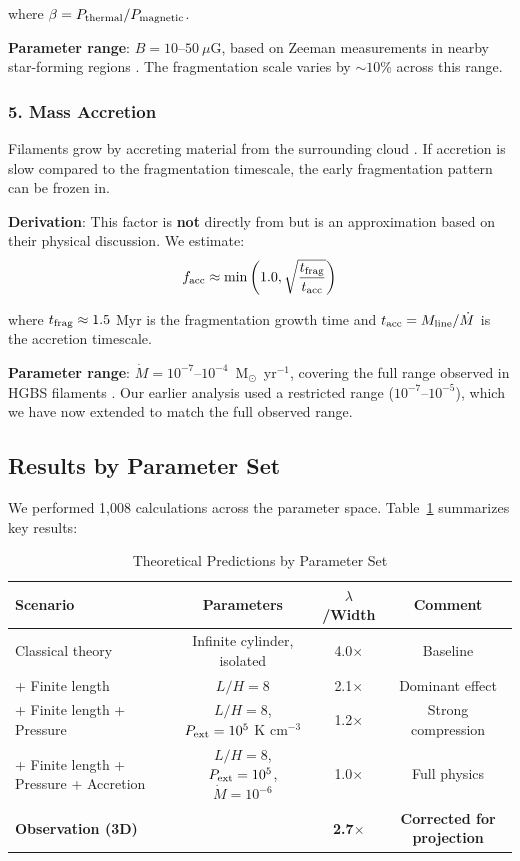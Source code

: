 \documentclass[11pt,a4paper]{article}
\begin{document}
where $\beta = P_{\rm thermal}/P_{\rm magnetic}$.

\textbf{Parameter range}: $B = 10$--$50~\mu$G, based on Zeeman measurements in nearby star-forming regions \citep{Crutcher2012}. The fragmentation scale varies by $\sim10\%$ across this range.

\subsubsection{5. Mass Accretion}

Filaments grow by accreting material from the surrounding cloud \citep{Heitsch2013}. If accretion is slow compared to the fragmentation timescale, the early fragmentation pattern can be frozen in.

\textbf{Derivation}: This factor is \textbf{not} directly from \citet{Heitsch2013} but is an approximation based on their physical discussion. We estimate:
\begin{equation}
f_{\rm acc} \approx \min\left(1.0, \sqrt{\frac{t_{\rm frag}}{t_{\rm acc}}}\right)
\end{equation}

where $t_{\rm frag} \approx 1.5$ Myr is the fragmentation growth time and $t_{\rm acc} = M_{\rm line}/\dot{M}$ is the accretion timescale.

\textbf{Parameter range}: $\dot{M} = 10^{-7}$--$10^{-4}$~M$_\odot$~yr$^{-1}$, covering the full range observed in HGBS filaments \citep{Palmeirim2013, Kirk2013}. Our earlier analysis used a restricted range ($10^{-7}$--$10^{-5}$), which we have now extended to match the full observed range.

\subsection{Results by Parameter Set}

We performed 1,008 calculations across the parameter space. Table~\ref{tab:results} summarizes key results:

\begin{table}[H]
\centering
\caption{Theoretical Predictions by Parameter Set}
\label{tab:results}
\begin{tabular}{lccc}
\toprule
Scenario & Parameters & $\lambda$/Width & Comment \\
\midrule
Classical theory & Infinite cylinder, isolated & 4.0$\times$ & Baseline \\
+ Finite length & $L/H=8$ & 2.1$\times$ & Dominant effect \\
+ Finite length + Pressure & $L/H=8$, $P_{\rm ext}=10^5$ K cm$^{-3}$ & 1.2$\times$ & Strong compression \\
+ Finite length + Pressure + Accretion & $L/H=8$, $P_{\rm ext}=10^5$, $\dot{M}=10^{-6}$ & 1.0$\times$ & Full physics \\
\midrule
\textbf{Observation (3D)} & & \textbf{2.7$\times$} & \textbf{Corrected for projection} \\
\bottomrule
\end{tabular}
\end{table}
\end{document}
